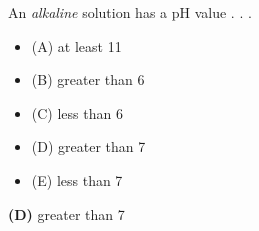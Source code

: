 

An {\it alkaline} solution has a pH value . . .

\begin{itemize}
\item{(A)} at least 11
\vskip 5pt 
\item{(B)} greater than 6
\vskip 5pt 
\item{(C)} less than 6
\vskip 5pt 
\item{(D)} greater than 7
\vskip 5pt 
\item{(E)} less than 7
\end{itemize}







{\bf (D)} greater than 7
 










